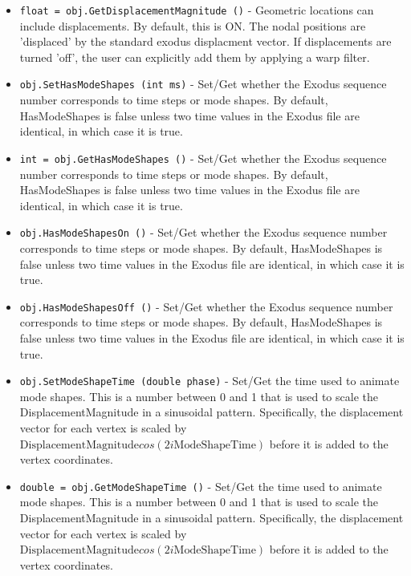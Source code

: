 \begin{itemize}
\item  \verb|float = obj.GetDisplacementMagnitude ()| -  Geometric locations can include displacements.  By default, 
 this is ON.  The nodal positions are 'displaced' by the
 standard exodus displacment vector. If displacements
 are turned 'off', the user can explicitly add them by
 applying a warp filter.

\item  \verb|obj.SetHasModeShapes (int ms)| -  Set/Get whether the Exodus sequence number corresponds to time steps or mode shapes.
 By default, HasModeShapes is false unless two time values in the Exodus file are identical,
 in which case it is true.

\item  \verb|int = obj.GetHasModeShapes ()| -  Set/Get whether the Exodus sequence number corresponds to time steps or mode shapes.
 By default, HasModeShapes is false unless two time values in the Exodus file are identical,
 in which case it is true.

\item  \verb|obj.HasModeShapesOn ()| -  Set/Get whether the Exodus sequence number corresponds to time steps or mode shapes.
 By default, HasModeShapes is false unless two time values in the Exodus file are identical,
 in which case it is true.

\item  \verb|obj.HasModeShapesOff ()| -  Set/Get whether the Exodus sequence number corresponds to time steps or mode shapes.
 By default, HasModeShapes is false unless two time values in the Exodus file are identical,
 in which case it is true.

\item  \verb|obj.SetModeShapeTime (double phase)| -  Set/Get the time used to animate mode shapes.
 This is a number between 0 and 1 that is used to scale the  DisplacementMagnitude
 in a sinusoidal pattern. Specifically, the displacement vector for each vertex is scaled by
 $ \mathrm{DisplacementMagnitude} cos( 2i \mathrm{ModeShapeTime} ) $ before it is
 added to the vertex coordinates.

\item  \verb|double = obj.GetModeShapeTime ()| -  Set/Get the time used to animate mode shapes.
 This is a number between 0 and 1 that is used to scale the  DisplacementMagnitude
 in a sinusoidal pattern. Specifically, the displacement vector for each vertex is scaled by
 $ \mathrm{DisplacementMagnitude} cos( 2i \mathrm{ModeShapeTime} ) $ before it is
 added to the vertex coordinates.


\end{itemize}

